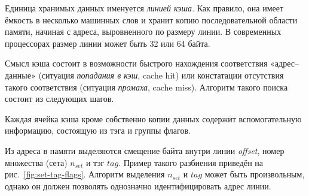 Единица хранимых данных именуется \textit{линией кэша}. Как правило, она имеет ёмкость в несколько машинных слов и хранит копию последовательной области памяти, начиная с адреса, выровненного по размеру линии. В современных процессорах размер линии может быть 32 или 64 байта. 

Смысл кэша состоит в возможности быстрого нахождения соответствия «адрес--данные» (ситуация \textit{попадания в кэш}, \abbr cache hit) или констатации отсутствия такого соответствия (ситуация \textit{промаха}, \abbr cache miss). Алгоритм такого поиска состоит из следующих шагов.

\begin{enumerate*}
\item Каждая ячейка кэша кроме собственно копии данных содержит вспомогательную информацию, состоящую из тэга и группы флагов.

\item Из адреса в памяти выделяются смещение байта внутри линии \textit{offset}, номер множества (сета) $n_{set}$ и тэг $tag$. Пример такого разбиения приведён на рис.~\ref{fig:set-tag-flags}. Алгоритм выделения $n_{set}$ и $tag$ может быть произвольным, однако он должен позволять однозначно идентифицировать адрес линии.

\begin{figure}[htb]
    \centering
\end{figure}
\end{enumerate*}
